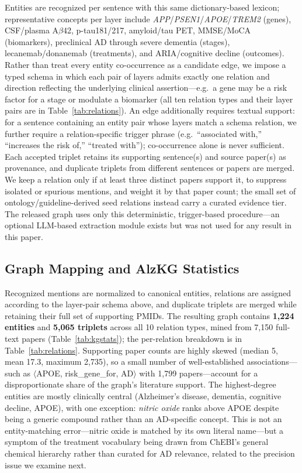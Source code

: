 \documentclass{article}
\begin{document}
Entities are recognized per sentence with this same dictionary-based lexicon; representative concepts per layer include \textit{APP}/\textit{PSEN1}/\textit{APOE}/\textit{TREM2} (genes), CSF/plasma A$\beta$42, p-tau181/217, amyloid/tau PET, MMSE/MoCA (biomarkers), preclinical AD through severe dementia (stages), lecanemab/donanemab (treatments), and ARIA/cognitive decline (outcomes). Rather than treat every entity co-occurrence as a candidate edge, we impose a typed schema in which each pair of layers admits exactly one relation and direction reflecting the underlying clinical assertion---e.g.\ a gene may be a risk factor for a stage or modulate a biomarker (all ten relation types and their layer pairs are in Table~\ref{tab:relations}). An edge additionally requires textual support: for a sentence containing an entity pair whose layers match a schema relation, we further require a relation-specific trigger phrase (e.g.\ ``associated with,'' ``increases the risk of,'' ``treated with''); co-occurrence alone is never sufficient. Each accepted triplet retains its supporting sentence(s) and source paper(s) as provenance, and duplicate triplets from different sentences or papers are merged. We keep a relation only if at least three distinct papers support it, to suppress isolated or spurious mentions, and weight it by that paper count; the small set of ontology/guideline-derived seed relations instead carry a curated evidence tier. The released graph uses only this deterministic, trigger-based procedure---an optional LLM-based extraction module exists but was not used for any result in this paper.

\subsection{Graph Mapping and AlzKG Statistics}
Recognized mentions are normalized to canonical entities, relations are assigned according to the layer-pair schema above, and duplicate triplets are merged while retaining their full set of supporting PMIDs. The resulting graph contains \textbf{1{,}224 entities} and \textbf{5{,}065 triplets} across all 10 relation types, mined from 7{,}150 full-text papers (Table~\ref{tab:kgstats}); the per-relation breakdown is in Table~\ref{tab:relations}. Supporting paper counts are highly skewed (median 5, mean 17.3, maximum 2{,}735), so a small number of well-established associations---such as $\langle$APOE, risk\_gene\_for, AD$\rangle$ with 1{,}799 papers---account for a disproportionate share of the graph's literature support. The highest-degree entities are mostly clinically central (Alzheimer's disease, dementia, cognitive decline, APOE), with one exception: \emph{nitric oxide} ranks above APOE despite being a generic compound rather than an AD-specific concept. This is not an entity-matching error---nitric oxide is matched by its own literal name---but a symptom of the treatment vocabulary being drawn from ChEBI's general chemical hierarchy rather than curated for AD relevance, related to the precision issue we examine next.
\end{document}
